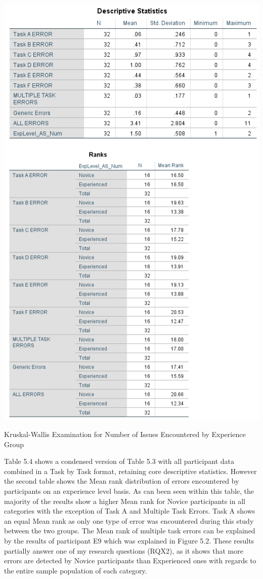 \begin{table}[H]
\includegraphics[width=\linewidth]{Screenshots/ErrorRecords/kwDescriptiveErrors.png}
\label{KWErrorsPerGroup}
\caption{Kruskal-Wallis Examination for Number of Issues Encountered by Experience Group}
\end{table}

Table 5.4 shows a condensed version of Table 5.3 with all participant data combined in a Task by Task format, retaining core descriptive statistics. However the second table shows the Mean rank distribution of errors encountered by participants on an experience level basis. As can been seen within this table, the majority of the results show a higher Mean rank for Novice participants in all categories with the exception of  Task A and Multiple Task Errors. Task A shows an equal Mean rank as only one type of error was encountered during this study between the two groups. The Mean rank of multiple task errors can be explained by the results of participant E9 which was explained in Figure 5.2. These results partially answer one of my research questions (RQX2), as it shows that more errors are detected by Novice participants than Experienced ones with regards to the entire sample population of each category.


